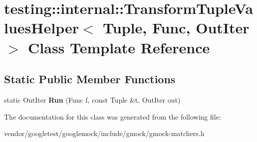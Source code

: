 \hypertarget{classtesting_1_1internal_1_1TransformTupleValuesHelper}{}\section{testing\+:\+:internal\+:\+:Transform\+Tuple\+Values\+Helper$<$ Tuple, Func, Out\+Iter $>$ Class Template Reference}
\label{classtesting_1_1internal_1_1TransformTupleValuesHelper}
\subsection*{Static Public Member Functions}
\begin{DoxyCompactItemize}
\item 
static Out\+Iter {\bfseries Run} (Func f, const Tuple \&t, Out\+Iter out)\hypertarget{classtesting_1_1internal_1_1TransformTupleValuesHelper_a27773f284f43c712ec72923a872d35fc}{}\label{classtesting_1_1internal_1_1TransformTupleValuesHelper_a27773f284f43c712ec72923a872d35fc}

\end{DoxyCompactItemize}


The documentation for this class was generated from the following file\+:\begin{DoxyCompactItemize}
\item 
vendor/googletest/googlemock/include/gmock/gmock-\/matchers.\+h\end{DoxyCompactItemize}
